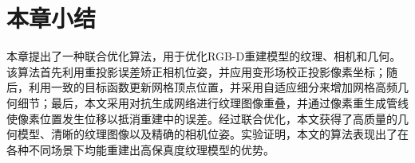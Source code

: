 \section{本章小结}

本章提出了一种联合优化算法，用于优化RGB-D重建模型的纹理、相机和几何。该算法首先利用重投影误差矫正相机位姿，并应用变形场校正投影像素坐标；随后，利用一致的目标函数更新网格顶点位置，并采用自适应细分来增加网格高频几何细节；最后，本文采用对抗生成网络进行纹理图像重叠，并通过像素重生成管线使像素位置发生位移以抵消重建中的误差。经过联合优化，本文获得了高质量的几何模型、清晰的纹理图像以及精确的相机位姿。实验证明，本文的算法表现出了在各种不同场景下均能重建出高保真度纹理模型的优势。

